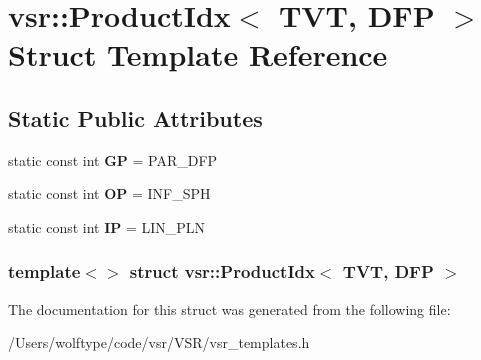 \hypertarget{structvsr_1_1_product_idx_3_01_t_v_t_00_01_d_f_p_01_4}{\section{vsr\-:\-:Product\-Idx$<$ T\-V\-T, D\-F\-P $>$ Struct Template Reference}
\label{structvsr_1_1_product_idx_3_01_t_v_t_00_01_d_f_p_01_4}
}
\subsection*{Static Public Attributes}
\begin{DoxyCompactItemize}
\item 
\hypertarget{structvsr_1_1_product_idx_3_01_t_v_t_00_01_d_f_p_01_4_ae92e28c4dd3e971b3d01734f75301e52}{static const int {\bfseries G\-P} = P\-A\-R\-\_\-\-D\-F\-P}\label{structvsr_1_1_product_idx_3_01_t_v_t_00_01_d_f_p_01_4_ae92e28c4dd3e971b3d01734f75301e52}

\item 
\hypertarget{structvsr_1_1_product_idx_3_01_t_v_t_00_01_d_f_p_01_4_a1b55fe966c48bcda91fde57e5c396c4c}{static const int {\bfseries O\-P} = I\-N\-F\-\_\-\-S\-P\-H}\label{structvsr_1_1_product_idx_3_01_t_v_t_00_01_d_f_p_01_4_a1b55fe966c48bcda91fde57e5c396c4c}

\item 
\hypertarget{structvsr_1_1_product_idx_3_01_t_v_t_00_01_d_f_p_01_4_a5f161e075c41bd8455eb07e6bb656d49}{static const int {\bfseries I\-P} = L\-I\-N\-\_\-\-P\-L\-N}\label{structvsr_1_1_product_idx_3_01_t_v_t_00_01_d_f_p_01_4_a5f161e075c41bd8455eb07e6bb656d49}

\end{DoxyCompactItemize}
\subsubsection*{template$<$$>$ struct vsr\-::\-Product\-Idx$<$ T\-V\-T, D\-F\-P $>$}



The documentation for this struct was generated from the following file\-:\begin{DoxyCompactItemize}
\item 
/\-Users/wolftype/code/vsr/\-V\-S\-R/vsr\-\_\-templates.\-h\end{DoxyCompactItemize}

